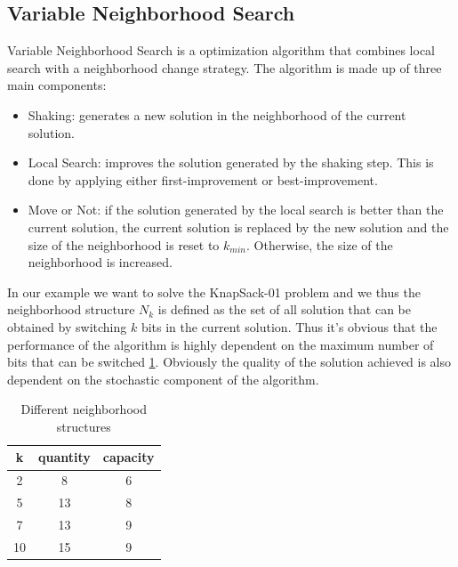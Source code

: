 \subsection{Variable Neighborhood Search}
Variable Neighborhood Search is a optimization algorithm that combines local search with a neighborhood change strategy. The algorithm is made up of three main components:
\begin{itemize}
    \item Shaking: generates a new solution in the neighborhood of the current solution.
    \item Local Search: improves the solution generated by the shaking step. This is done by applying either first-improvement or best-improvement.
    \item Move or Not: if the solution generated by the local search is better than the current solution, the current solution is replaced by the new solution and the size of the neighborhood is reset to $k_{min}$. Otherwise, the size of the neighborhood is increased.
\end{itemize}

In our example we want to solve the KnapSack-01 problem and we thus the neighborhood structure $N_k$ is defined as the set of all solution that can be obtained by switching $k$ bits in the current solution. Thus it's obvious that the performance of the algorithm is highly dependent on the maximum number of bits that can be switched \ref{tab:neighborhood}. Obviously the quality of the solution achieved is also dependent on the stochastic component of the algorithm.
\begin{table}[H]
    \centering
    \begin{tabular}{c||c |c}
        k  & quantity & capacity \\ \hline
        2  & 8        & 6        \\
        5  & 13       & 8        \\
        7  & 13       & 9        \\
        10 & 15       & 9        \\
    \end{tabular}
    \caption{Different neighborhood structures}
    \label{tab:neighborhood}
\end{table}

